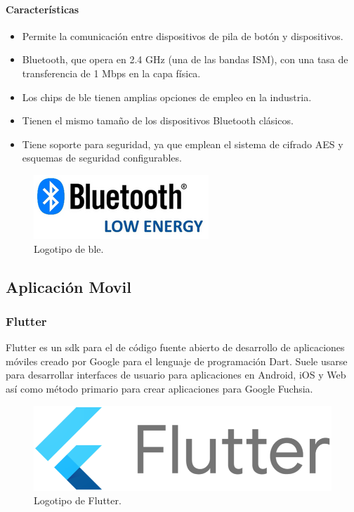     \paragraph{Características}
    \begin{itemize}
        \item Permite la comunicación entre dispositivos de pila de botón y dispositivos.
        \item Bluetooth, que opera en 2.4 GHz (una de las bandas ISM), con una tasa de transferencia de 1 Mbps en la capa física.
        \item Los chips de \acrshort{ble} tienen amplias opciones de empleo en la industria.
        \item Tienen el mismo tamaño de los dispositivos Bluetooth clásicos.
        \item Tiene soporte para seguridad, ya que emplean el sistema de cifrado AES y esquemas de seguridad configurables.
    \end{itemize}

    \begin{figure}[htp!]
        \centering
        \includegraphics[width = 0.30 \textwidth]{bluetooth.png}
        \caption{Logotipo de \acrshort{ble}.}
        \label{fig: bluetooth}
    \end{figure}
    \FloatBarrier

\subsection{Aplicación Movil}
    \subsubsection{Flutter}    
    Flutter es un \acrshort{sdk} para el de código fuente abierto de desarrollo de aplicaciones móviles creado por Google 
    para el lenguaje de programación Dart. Suele usarse para desarrollar interfaces de usuario para aplicaciones en Android, iOS y Web 
    así como método primario para crear aplicaciones para Google Fuchsia.​

    \begin{figure}[htp!]
        \centering
        \includegraphics[width = 0.30 \textwidth]{flutter.png}
        \caption{Logotipo de Flutter.}
        \label{fig: flutter}
    \end{figure}
    \FloatBarrier

